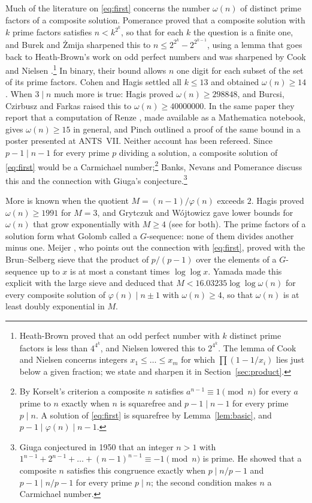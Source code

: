 \documentclass[11pt,reqno]{amsart}
\numberwithin{equation}{section}
\theoremstyle{plain}
\theoremstyle{definition}
\theoremstyle{remark}
\begin{document}
Much of the literature on \eqref{eq:first} concerns the number
$\omega(n)$ of distinct prime factors of a composite solution.
Pomerance \cite{Pom77} proved that a composite solution with $k$ prime
factors satisfies $n<k^{2^k}$, so that for each $k$ the question is a
finite one, and Burek and \.Zmija \cite{BZ19} sharpened this to
$n\le2^{2^k}-2^{2^{k-1}}$, using a lemma that goes back to
Heath-Brown's work on odd perfect numbers \cite{HB94} and was
sharpened by Cook \cite{Coo99} and Nielsen \cite{Nie03}.\footnote{Heath-Brown
proved that an odd perfect number with $k$ distinct prime factors is
less than $4^{4^k}$, and Nielsen lowered this to $2^{4^k}$. The lemma
of Cook and Nielsen concerns integers $x_1\le\dots\le x_m$ for which
$\prod(1-1/x_i)$ lies just below a given fraction; we state and
sharpen it in Section~\ref{sec:product}.} In binary,
their bound allows $n$ one digit for each subset of the set of its
prime factors. Cohen and Hagis \cite{CH80} settled all $k\le13$ and
obtained $\omega(n)\ge14$. When $3\mid n$ much more is true: Hagis
\cite{Hag88} proved $\omega(n)\ge298848$, and Burcsi, Czirbusz and
Farkas \cite{BCF11} raised this to $\omega(n)\ge40000000$. In the same
paper they report that a computation of Renze \cite{Ren04}, made
available as a Mathematica notebook, gives $\omega(n)\ge15$ in general,
and Pinch \cite{Pin06} outlined a proof of the same bound in a poster
presented at ANTS~VII. Neither account has been refereed. Since $p-1\mid n-1$ for every prime
$p$ dividing a solution, a composite solution of \eqref{eq:first}
would be a Carmichael number;\footnote{By Korselt's criterion a
composite $n$ satisfies $a^{n-1}\equiv1\pmod n$ for every $a$ prime to
$n$ exactly when $n$ is squarefree and $p-1\mid n-1$ for every prime
$p\mid n$. A solution of \eqref{eq:first} is squarefree by
Lemma~\ref{lem:basic}, and $p-1\mid\varphi(n)\mid n-1$.} Banks, Nevans and Pomerance \cite{BNP09}
discuss this and the connection with Giuga's conjecture.\footnote{Giuga
conjectured in 1950 that an integer $n>1$ with
$1^{n-1}+2^{n-1}+\dots+(n-1)^{n-1}\equiv-1\pmod n$ is prime. He showed
that a composite $n$ satisfies this congruence exactly when
$p\mid n/p-1$ and $p-1\mid n/p-1$ for every prime $p\mid n$; the second
condition makes $n$ a Carmichael number.}

More is known when the quotient $M=(n-1)/\varphi(n)$ exceeds $2$.
Hagis \cite{Hag88} proved $\omega(n)\ge1991$ for $M=3$, and Grytczuk
and W\'ojtowicz \cite{GW03} gave lower bounds for $\omega(n)$ that
grow exponentially with $M\ge4$ (see \cite{Yam23} for both). The prime
factors of a solution form what Golomb \cite{Gol55} called a
$G$-sequence: none of them divides another minus one. Meijer
\cite{Mei74}, who points out the connection with \eqref{eq:first},
proved with the Brun--Selberg sieve that the product of $p/(p-1)$ over
the elements of a $G$-sequence up to $x$ is at most a constant times
$\log\log x$. Yamada \cite{Yam23} made this explicit with the large
sieve and deduced that $M<16.03235\log\log\omega(n)$ for every
composite solution of $\varphi(n)\mid n\pm1$ with $\omega(n)\ge4$, so
that $\omega(n)$ is at least doubly exponential in $M$.
\end{document}
